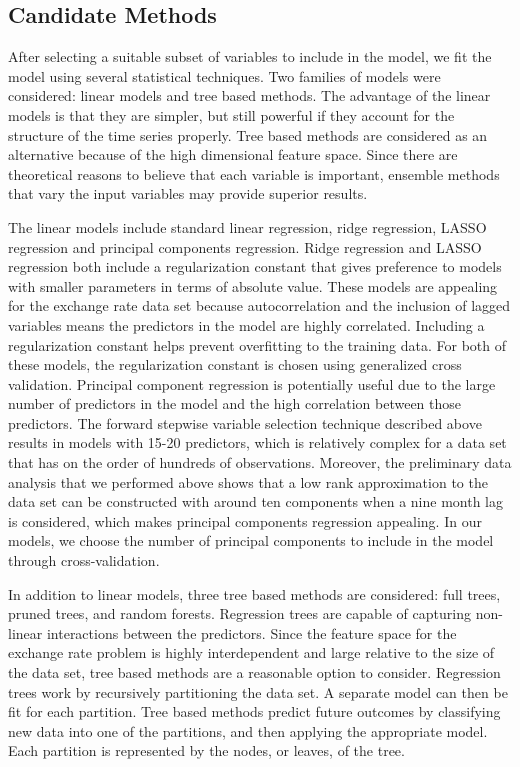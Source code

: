 \documentclass{sig-alternate-05-2015}
\begin{document}
\subsection{Candidate Methods}
After selecting a suitable subset of variables to include in the model, we fit the model using several statistical techniques. Two families of models were considered: linear models and tree based methods. The advantage of the linear models is that they are simpler, but still powerful if they account for the structure of the time series properly. Tree based methods are considered as an alternative because of the high dimensional feature space. Since there are theoretical reasons to believe that each variable is important, ensemble methods that vary the input variables may provide superior results.

\par{} The linear models include standard linear regression, ridge regression, LASSO regression and principal components regression. Ridge regression and LASSO regression both include a regularization constant that gives preference to models with smaller parameters in terms of absolute value. These models are appealing for the exchange rate data set because autocorrelation and the inclusion of lagged variables means the predictors in the model are highly correlated. Including a regularization constant helps prevent overfitting to the training data. For both of these models, the regularization constant is chosen using generalized cross validation. Principal component regression is potentially useful due to the large number of predictors in the model and the high correlation between those predictors. The forward stepwise variable selection technique described above results in models with 15-20 predictors, which is relatively complex for a data set that has on the order of hundreds of observations. Moreover, the preliminary data analysis that we performed above shows that a low rank approximation to the data set can be constructed with around ten components when a nine month lag is considered, which makes principal components regression appealing. In our models, we choose the number of principal components to include in the model through cross-validation.

\par{} In addition to linear models, three tree based methods are considered: full trees, pruned trees, and random forests. Regression trees are capable of capturing non-linear interactions between the predictors. Since the feature space for the exchange rate problem is highly interdependent and large relative to the size of the data set, tree based methods are a reasonable option to consider. Regression trees work by recursively partitioning the data set. A separate model can then be fit for each partition. Tree based methods predict future outcomes by classifying new data into one of the partitions, and then applying the appropriate model. Each partition is represented by the nodes, or leaves, of the tree. 
\end{document}
